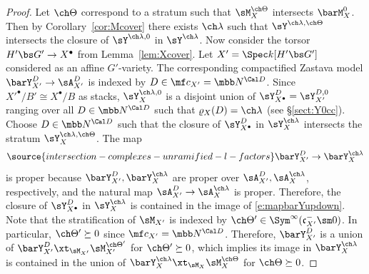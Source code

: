 \begin{proof}
Let $\ch\Theta$ correspond to a stratum such that
$\sM_X^{\ch\Theta}$ intersects $\barM_X^0$. Then by
Corollary~\ref{cor:Mcover} there exists $\ch\lambda$
such that $\sY^{\ch\lambda,\ch\Theta}$ intersects the closure
of $\sY^{\ch\lambda,0}$ in $\sY^{\ch\lambda}$.
Now consider the torsor $H'\bs G' \to X^\bullet$ from
Lemma~\ref{lem:Xcover}.
Let $X' = \Spec k[H'\bs G']$ considered as an affine $G'$-variety.
The corresponding compactified Zastava model
$\barY^{D}_{X'} \to \sA^{D}_{X'}$ is indexed
by $D\in \mf c_{X'}=\mbb N^{\Cal D}$.
Since $X'^\bullet/B' \cong X^\bullet/B$ as stacks,
$\sY^{\ch\lambda,0}_X$ is a disjoint union of $\sY^D_{X^\bullet}=\sY^{D,0}_{X'}$
ranging over all $D\in \mbb N^{\Cal D}$ such that $\varrho_X(D)=\ch\lambda$
(see \S\ref{sect:Y0cc}).
Choose $D\in \mbb N^{\Cal D}$ such that the closure of
$\sY^D_{X^\bullet}$ in $\sY^{\ch\lambda}_X$ intersects
the stratum $\sY^{\ch\lambda,\ch\Theta}_X$.
The map
\begin{equation} \label{e:mapbarYupdown}
\source{intersection-complexes-unramified-l-factors}
 \barY^{D}_{X'} \to \barY^{\ch\lambda}_X
\end{equation}
is proper because $\barY^{D}_{X'}, \barY^{\ch\lambda}_X$
are proper over $\sA^{D}_{X'},\sA^{\ch\lambda}_X$, respectively,
and the natural map $\sA^{D}_{X'}\to \sA^{\ch\lambda}_X$
is proper. Therefore, the closure of $\sY^{D}_{X^\bullet}$
in $\sY^{\ch\lambda}_X$ is contained in the image
of \eqref{e:mapbarYupdown}.
Note that the stratification of $\sM_{X'}$ is indexed by
$\ch\Theta' \in \Sym^\infty(\mathfrak c_{X'}^-\sm 0)$.
In particular, $\ch\Theta' \succeq 0$ since $\mf c_{X'}=\mbb N^{\Cal D}$.
Therefore, $\barY^{D}_{X'}$ is a union of
$\barY^{D}_{X'} \xt_{\sM_{X'}} \sM_{X'}^{\ch\Theta'}$
for $\ch\Theta' \succeq 0$, which implies its image in
$\barY^{\ch\lambda}_X$ is contained in the union
of $\barY^{\ch\lambda}_X \xt_{\sM_X} \sM_X^{\ch\Theta}$
for $\ch\Theta \succeq 0$.
\end{proof}



